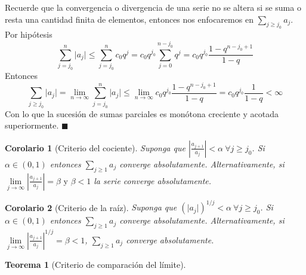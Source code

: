 \documentclass[12pt]{book}
\providecommand{\abs}[1]{\lvert#1\rvert}
\newtheorem{teo}{Teorema}[section]
\newtheorem{coro}{Corolario}[section]
\begin{document}
Recuerde que la convergencia o divergencia de una serie no se altera si se suma o resta una cantidad finita de elementos, entonces nos enfocaremos en $\sum_{j \ge j_0}a_j$.
Por hipótesis $$\sum_{j=j_0}^n\abs{a_j} \le \sum_{j=j_0}^nc_0q^j=c_0q^{j_0}\sum_{j=0}^{n-j_0}q^j=c_0q^{j_0}\frac{1-q^{n-j_0+1}}{1-q}$$
Entonces $$\sum_{j \ge j_0}\abs{a_j}=\lim\limits_{n \to \infty}\sum_{j=j_0}^n\abs{a_j} \le \lim\limits_{n \to \infty}c_0q^{j_0}\frac{1-q^{n-j_0+1}}{1-q}=c_0q^{j_0}\frac{1}{1-q}<\infty$$ Con lo que la sucesión de sumas parciales es monótona creciente y acotada superiormente. $\blacksquare$
\begin{coro}[Criterio del cociente]\rm
Suponga que $\left| \frac{a_{j+1}}{a_j} \right| < \alpha \ \forall{j \ge j_0}$. Si $\alpha \in (0,1)$ entonces $\sum_{j \ge 1}a_j$ converge absolutamente. Alternativamente, si $\lim\limits_{j \to \infty}\left| \frac{a_{j+1}}{a_j} \right|= \beta \mbox{ y } \beta<1$ la serie converge absolutamente.
\end{coro}
\begin{coro}[Criterio de la raíz]\rm
Suponga que $(\abs{a_j})^{1/j}<\alpha \ \forall{j \ge j_0}$. Si $\alpha \in (0,1)$ entonces $\sum_{j \ge 1}a_j$ converge absolutamente. Alternativamente, si $\lim\limits_{j \to \infty}\left| \frac{a_{j+1}}{a_j} \right|^{1/j}=\beta<1$, $\sum_{j \ge 1}a_j$ converge absolutamente.
\end{coro}
\begin{teo}[Criterio de comparación del límite]\rm

\end{teo}
\end{document}
